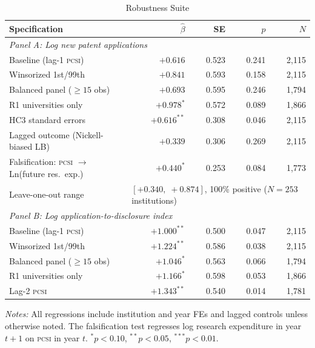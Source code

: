 \documentclass[12pt]{article}
\newcommand{\PCSI}{\textsc{pcsi}}
\begin{document}
\begin{table}[htbp]
\centering
\caption{Robustness Suite}
\label{tab:b1}
\begin{threeparttable}
\begin{tabular}{lrrrr}
\toprule
Specification & $\hat\beta$ & SE & $p$ & $N$ \\
\midrule
\multicolumn{5}{l}{\textit{Panel A: Log new patent applications}} \\
Baseline (lag-1 \PCSI{}) & $+0.616$ & 0.523 & 0.241 & 2,115 \\
Winsorized 1st/99th & $+0.841$ & 0.593 & 0.158 & 2,115 \\
Balanced panel ($\geq 15$ obs) & $+0.693$ & 0.595 & 0.246 & 1,794 \\
R1 universities only & $+0.978^*$ & 0.572 & 0.089 & 1,866 \\
HC3 standard errors & $+0.616^{**}$ & 0.308 & 0.046 & 2,115 \\
Lagged outcome (Nickell-biased LB) & $+0.339$ & 0.306 & 0.269 & 2,115 \\
Falsification: \PCSI{} $\to$ Ln(future res.\ exp.) & $+0.440^*$ & 0.253 & 0.084 & 1,773 \\
Leave-one-out range & \multicolumn{4}{l}{$[+0.340,\; +0.874]$, 100\% positive ($N=253$ institutions)} \\
\midrule
\multicolumn{5}{l}{\textit{Panel B: Log application-to-disclosure index}} \\
Baseline (lag-1 \PCSI{}) & $+1.000^{**}$ & 0.500 & 0.047 & 2,115 \\
Winsorized 1st/99th & $+1.224^{**}$ & 0.586 & 0.038 & 2,115 \\
Balanced panel ($\geq 15$ obs) & $+1.046^{*}$ & 0.563 & 0.066 & 1,794 \\
R1 universities only & $+1.166^{*}$ & 0.598 & 0.053 & 1,866 \\
Lag-2 \PCSI{} & $+1.343^{**}$ & 0.540 & 0.014 & 1,781 \\
\bottomrule
\end{tabular}
\begin{tablenotes}
\small
\item \textit{Notes:} All regressions include institution and year FEs and lagged
controls unless otherwise noted. The falsification test regresses log research
expenditure in year $t+1$ on \PCSI{} in year $t$. $^*p<0.10$, $^{**}p<0.05$,
$^{***}p<0.01$.
\end{tablenotes}
\end{threeparttable}
\end{table}
\end{document}
